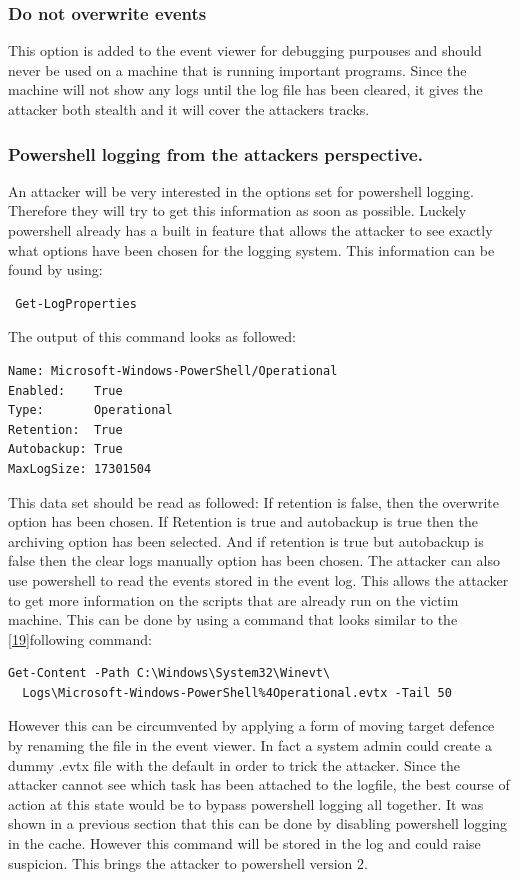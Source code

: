 \documentclass{article}%
\begin{document}
\subsubsection{Do not overwrite events}
This option is added to the event viewer for debugging purpouses and should never be used on a machine that is running important programs. Since the machine will not show any logs until the log file has been cleared, it gives the attacker both stealth and it will cover the attackers tracks. 
\subsubsection{Powershell logging from the attackers perspective.}
An attacker will be very interested in the options set for powershell logging. Therefore they will try to get this information as soon as possible. Luckely powershell already has a built in feature that allows the attacker to see exactly what options have been chosen for the logging system. This information can be found by using:
\begin{verbatim}
 Get-LogProperties
\end{verbatim}
The output of this command looks as followed:
\begin{verbatim}
Name: Microsoft-Windows-PowerShell/Operational
Enabled:    True
Type:       Operational
Retention:  True
Autobackup: True
MaxLogSize: 17301504
\end{verbatim}
This data set should be read as followed:\newline\newline
If retention is false, then the overwrite option has been chosen. If Retention is true and autobackup is true then the archiving option has been selected. And if retention is true but autobackup is false then the clear logs manually option has been chosen. The attacker can also use powershell to read the events stored in the event log. This allows the attacker to get more information on the scripts that are already run on the victim machine. This can be done by using a command that looks similar to the [\hyperlink{19}{19}]following command:
\begin{verbatim}
Get-Content -Path C:\Windows\System32\Winevt\
  Logs\Microsoft-Windows-PowerShell%4Operational.evtx -Tail 50
\end{verbatim}
However this can be circumvented by applying a form of moving target defence by renaming the file in the event viewer. In fact a system admin could create a dummy .evtx file with the default in order to trick the attacker. Since the attacker cannot see which task has been attached to the logfile, the best course of action at this state would be to bypass powershell logging all together. It was shown in a previous section that this can be done by disabling powershell logging in the cache. However this command will be stored in the log and could raise suspicion. This brings the attacker to powershell version $2$.
\end{document}
